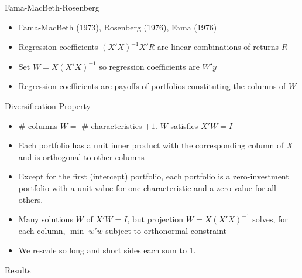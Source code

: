 \documentclass[aspectratio=169]{beamer}
\begin{document}
\begin{frame}{Fama-MacBeth-Rosenberg}
\begin{itemize}
  \item Fama-MacBeth (1973), Rosenberg (1976), Fama (1976)
  \item Regression coefficients $(X'X)^{-1}X'R$ are linear combinations of returns $R$
  \item Set $W = X(X'X)^{-1}$ so regression coefficients are $W'y$
  \item Regression coefficients are payoffs of portfolios constituting the columns of $W$
\end{itemize}
\end{frame}

\begin{frame}{Diversification Property}
\begin{itemize}
  \item \# columns $W=$ \# characteristics $+1$.  $W$ satisfies $X'W=I$
  \item Each portfolio has a unit inner product with the corresponding column of $X$ and is orthogonal to other columns
  \item Except for the first (intercept) portfolio, each portfolio is a zero-investment portfolio with a unit value for one characteristic and a zero value for all others.
  \item Many solutions $W$ of $X'W=I$, but projection $W=X(X'X)^{-1}$ solves, for each column, $\min \; w'w$ subject to orthonormal constraint
  \item We rescale so long and short sides each sum to 1.
\end{itemize}
\end{frame}


\begin{frame}[c]
  \centering
  \Huge Results
\end{frame}
\end{document}
